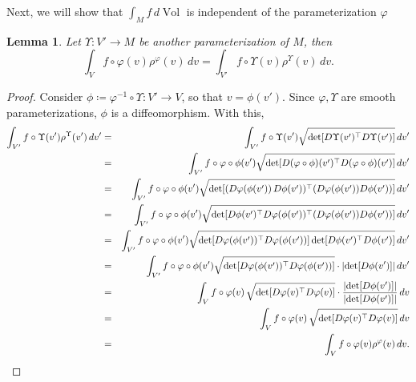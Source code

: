 \documentclass{article}
\renewcommand\det{\operatorname{det}}
\newcommand{\f}[2]{\frac{#1}{#2}}
\theoremstyle{theorem}
\newtheorem{lemma}[theorem]{Lemma}
\newcommand{\Vol}{\operatorname{Vol}}
\begin{document}
Next, we will show that $\int_M f\,d\Vol$ is independent of the parameterization $\varphi$

\begin{lemma}
Let $\Upsilon: V' \to M$ be another parameterization of $M$, then 
\begin{equation*}
    \int_{V} f\circ \varphi(v) \rho^\varphi(v)\,dv = \int_{V'} f\circ \Upsilon(v) \rho^{\Upsilon}(v)\,dv.
\end{equation*}
\end{lemma}


\begin{proof}
Consider $\phi \coloneqq \varphi^{-1}\circ \Upsilon : V'\to V$, so that $v = \phi(v')$. Since $\varphi, \Upsilon$ are smooth parameterizations, $\phi$ is a diffeomorphism. With this, 
\begin{eqnarray*}
    \int_{V'}f\circ \Upsilon(v') \rho^{\Upsilon}(v')\,dv' 
    &=& \int_{V'}f\circ \Upsilon(v') \sqrt{\det [ D \Upsilon (v') ^\top D \Upsilon(v') ]}\,dv' \\
    &=& \int_{V'}f\circ \varphi \circ \phi (v') \sqrt{\det [ D (\varphi \circ \phi) (v')^\top D (\varphi \circ \phi) (v') ]}\,dv' \\
    &=& \int_{V'}f\circ \varphi \circ \phi (v') \sqrt{\det[ (D\varphi(\phi(v'))\,D \phi (v'))^\top  (D\varphi(\phi(v'))D \phi (v')) ] }\,dv' \\
    &=& \int_{V'}f\circ \varphi \circ \phi (v') \sqrt{\det[ D\phi(v')^\top D\varphi(\phi(v'))^\top (D\varphi(\phi(v')) D \phi (v'))  ]}\,dv' \\
    &=& \int_{V'}f\circ \varphi \circ \phi (v') \sqrt{\det[  D\varphi(\phi(v'))^\top D\varphi(\phi(v'))  ]\det[D \phi(v')^\top D \phi(v')]}\,dv' \\
    &=& \int_{V'}f\circ \varphi \circ \phi (v') \sqrt{\det[  D\varphi(\phi(v'))^\top D\varphi(\phi(v'))  ]}\cdot   \abs{\det[D\phi(v')]}\,dv' \\
    &=& \int_V f\circ \varphi(v)\,\sqrt{\det[D \varphi(v)^\top D \varphi(v)]} \cdot \f{\abs{\det[D\phi(v')]}}{\abs{\det[D\phi(v')]}} \,dv \\ 
    &=& \int_V f\circ \varphi(v)\,\sqrt{\det[D \varphi(v)^\top D \varphi(v)]} \,dv\\
    &=& \int_{V} f\circ \varphi(v) \rho^\varphi(v)\,dv.
\end{eqnarray*}
\end{proof}



\end{document}
